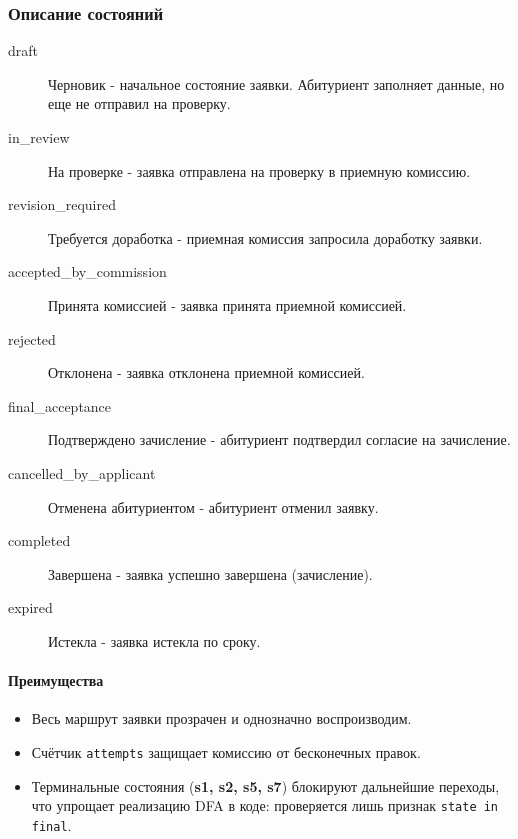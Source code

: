 \documentclass[areasetadvanced]{scrartcl}
\begin{document}
\subsubsection{Описание состояний}
\begin{description}
  \item[draft] Черновик - начальное состояние заявки. Абитуриент заполняет данные, но еще не отправил на проверку.
  \item[in\_review] На проверке - заявка отправлена на проверку в приемную комиссию.
  \item[revision\_required] Требуется доработка - приемная комиссия запросила доработку заявки.
  \item[accepted\_by\_commission] Принята комиссией - заявка принята приемной комиссией.
  \item[rejected] Отклонена - заявка отклонена приемной комиссией.
  \item[final\_acceptance] Подтверждено зачисление - абитуриент подтвердил согласие на зачисление.
  \item[cancelled\_by\_applicant] Отменена абитуриентом - абитуриент отменил заявку.
  \item[completed] Завершена - заявка успешно завершена (зачисление).
  \item[expired] Истекла - заявка истекла по сроку.
\end{description}

\paragraph{Преимущества}
\begin{itemize}
  \item Весь маршрут заявки прозрачен и однозначно воспроизводим.  
  \item Счётчик \verb|attempts| защищает комиссию от бесконечных правок.  
  \item Терминальные состояния (\textbf{s1, s2, s5, s7}) блокируют дальнейшие переходы, 
        что упрощает реализацию DFA в коде: проверяется лишь признак \verb|state in final|.
\end{itemize}

\newpage
\end{document}
